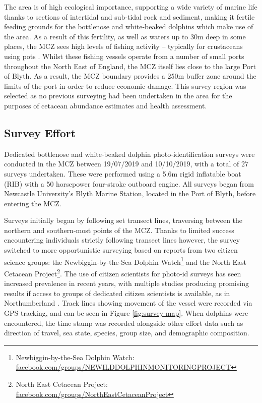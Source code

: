 The area is of high ecological importance, supporting a wide variety of marine life thanks to sections of intertidal and sub-tidal rock and sediment, making it fertile feeding grounds for the bottlenose and white-beaked dolphins which make use of the area. As a result of this fertility, as well as waters up to 30m deep in some places, the MCZ sees high levels of fishing activity -- typically for crustaceans using pots \cite{stephenson_spatial_2017}. Whilst these fishing vessels operate from a number of small ports throughout the North East of England, the MCZ itself lies close to the large Port of Blyth. As a result, the MCZ boundary provides a 250m buffer zone around the limits of the port in order to reduce economic damage. This survey region was selected as no previous surveying had been undertaken in the area for the purposes of cetacean abundance estimates and health assessment.  

\subsection{Survey Effort}\label{ch:datasetCreation,sec:NDD,sub:surveyEffort}

Dedicated bottlenose and white-beaked dolphin photo-identification surveys were conducted in the MCZ between 19/07/2019 and 10/10/2019, with a total of 27 surveys undertaken. These were performed using a 5.6m rigid inflatable boat (RIB) with a 50 horsepower four-stroke outboard engine. All surveys began from Newcastle University's Blyth Marine Station, located in the Port of Blyth, before entering the MCZ.

Surveys initially began by following set transect lines, traversing between the northern and southern-most points of the MCZ. Thanks to limited success encountering individuals strictly following transect lines however, the survey switched to more opportunistic surveying based on reports from two citizen science groups: the Newbiggin-by-the-Sea Dolphin Watch\footnote{Newbiggin-by-the-Sea Dolphin Watch: \href{https://en-gb.facebook.com/groups/NEWILDDOLPHINMONITORINGPROJECT/}{facebook.com/groups/NEWILDDOLPHINMONITORINGPROJECT}} and the North East Cetacean Project\footnote{North East Cetacean Project: \href{https://en-gb.facebook.com/groups/NorthEastCetaceanProject/about/}{facebook.com/groups/NorthEastCetaceanProject}}. The use of citizen scientists for photo-id surveys has seen increased prevalence in recent years, with multiple studies producing promising results if access to groups of dedicated citizen scientists is available, as in Northumberland \cite{araujo_population_2017, currie_conservation_2018, armstrong_photographic_2019, araujo_photo-id_2019}. Track lines showing movement of the vessel were recorded via GPS tracking, and can be seen in Figure \ref{fig:survey-map}. When dolphins were encountered, the time stamp was recorded alongside other effort data such as direction of travel, sea state, species, group size, and demographic composition.

